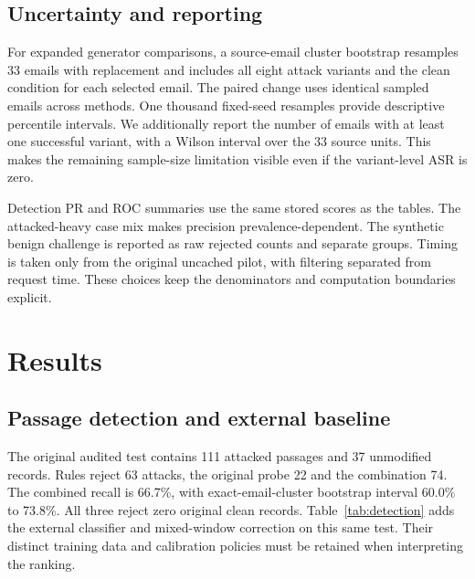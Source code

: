\documentclass[conference,a4paper]{IEEEtran}
\begin{document}
\subsection{Uncertainty and reporting}
For expanded generator comparisons, a source-email cluster bootstrap resamples 33 emails with replacement and includes all eight attack variants and the clean condition for each selected email. The paired change uses identical sampled emails across methods. One thousand fixed-seed resamples provide descriptive percentile intervals. We additionally report the number of emails with at least one successful variant, with a Wilson interval over the 33 source units. This makes the remaining sample-size limitation visible even if the variant-level ASR is zero.

Detection PR and ROC summaries use the same stored scores as the tables. The attacked-heavy case mix makes precision prevalence-dependent. The synthetic benign challenge is reported as raw rejected counts and separate groups. Timing is taken only from the original uncached pilot, with filtering separated from request time. These choices keep the denominators and computation boundaries explicit.

\section{Results}
\subsection{Passage detection and external baseline}
The original audited test contains 111 attacked passages and 37 unmodified records. Rules reject 63 attacks, the original probe 22 and the combination 74. The combined recall is 66.7\%, with exact-email-cluster bootstrap interval 60.0\% to 73.8\%. All three reject zero original clean records. Table~\ref{tab:detection} adds the external classifier and mixed-window correction on this same test. Their distinct training data and calibration policies must be retained when interpreting the ranking.
\end{document}
